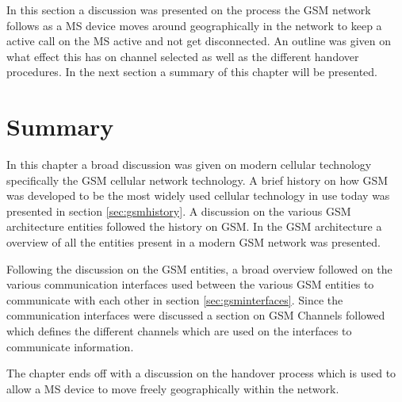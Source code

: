 In this section a discussion was presented on the process the GSM network follows as a MS device moves around geographically in the network to keep a active call on the MS active and not get disconnected. An outline was given on what effect this has on channel selected as well as the different handover procedures. In the next section a summary of this chapter will be presented. 
\section{Summary}
In this chapter a broad discussion was given on modern cellular technology specifically the GSM cellular network technology. A brief history on how GSM was developed to be the most widely used cellular technology in use today was presented in section \ref{sec:gsmhistory}. A discussion on the various GSM architecture entities followed the history on GSM. In the GSM architecture a overview of all the entities present in a modern GSM network was presented.

Following the discussion on the GSM entities, a broad overview followed on the various communication interfaces used between the various GSM entities to communicate with each other in section \ref{sec:gsminterfaces}. Since the communication interfaces were discussed a section on GSM Channels followed which defines the different channels which are used on the interfaces to communicate information.

The chapter ends off with a discussion on the handover process which is used to allow a MS device to move freely geographically within the network. 
